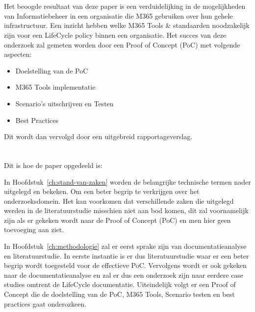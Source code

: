 \section{}%
\label{sec:onderzoeksdoelstelling}

Het beoogde resultaat van deze paper is een verduidelijking in de mogelijkheden van Informatiebeheer in een organisatie die M365 gebruiken over hun gehele infrastructuur.
Een inzicht hebben welke M365 Tools & standaarden noodzakelijk zijn voor een LifeCycle policy binnen een organisatie.
Het succes van deze onderzoek zal gemeten worden door een Proof of Concept (PoC) met volgende aspecten:
\begin{itemize}
  \item Doelstelling van de PoC
  \item M365 Tools implementatie
  \item Scenario's uitschrijven en Testen
  \item Best Practices
\end{itemize}

Dit wordt dan vervolgd door een uitgebreid rapportageverslag.

\section{}%
\label{sec:opzet-bachelorproef}


Dit is hoe de paper opgedeeld is:

In Hoofdstuk~\ref{ch:stand-van-zaken} worden de belangrijke technische termen nader uitgelegd en bekeken. Om een beter begrip te verkrijgen over het onderzoeksdomein.
Het kan voorkomen dat verschillende zaken die uitgelegd werden in de literatuurstudie misschien niet aan bod komen, dit zal voornamelijk zijn als er gekeken wordt naar de Proof of Concept (PoC) en men hier geen toevoeging aan ziet.

In Hoofdstuk~\ref{ch:methodologie} zal er eerst sprake zijn van documentatieanalyse en literatuurstudie. In eerste instantie is er dus literatuurstudie waar er een beter begrip wordt toegesteld voor de effectieve PoC.
Vervolgens wordt er ook gekeken naar de documentatieanalyse en zal er dus een onderzoek zijn naar eerdere case studies omtrent de LifeCycle documentatie.
Uiteindelijk volgt er een Proof of Concept die de doelstelling van de PoC, M365 Tools, Scenario testen en best practices gaat onderozkeen.

